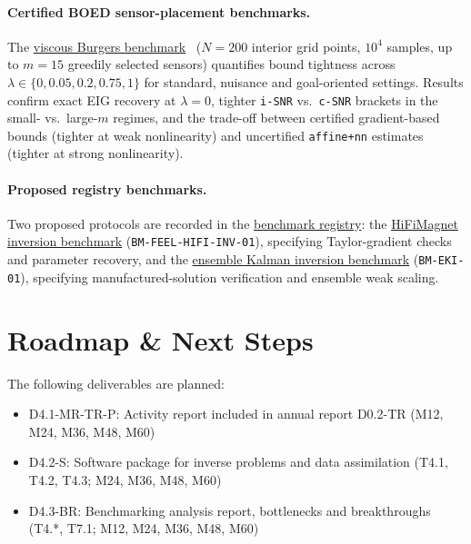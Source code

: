 \paragraph{Certified BOED sensor-placement benchmarks.}
The \hyperref[sec:wp4:sensor-placement]{viscous Burgers benchmark}~\cite{hal-05768497}
($N = 200$ interior grid points, $10^4$ samples, up to $m = 15$ greedily selected
sensors) quantifies bound tightness across $\lambda \in \{0, 0.05, 0.2, 0.75, 1\}$
for standard, nuisance and goal-oriented settings. Results confirm exact EIG
recovery at $\lambda = 0$, tighter \texttt{i-SNR} vs.\ \texttt{c-SNR} brackets
in the small- vs.\ large-$m$ regimes, and the trade-off between certified
gradient-based bounds (tighter at weak nonlinearity) and uncertified
\texttt{affine+nn} estimates (tighter at strong nonlinearity).

\paragraph{Proposed registry benchmarks.}
Two proposed protocols are recorded in the
\hyperref[tab:v3-benchmark-registry]{benchmark registry}: the
\hyperref[sec:app:specs:app-feelpp-hifimagnet-inverse]{HiFiMagnet
inversion benchmark} (\nolinkurl{BM-FEEL-HIFI-INV-01}), specifying
Taylor-gradient checks and parameter recovery, and the
\hyperref[sec:app:specs:app-eki]{ensemble Kalman inversion benchmark}
(\nolinkurl{BM-EKI-01}), specifying manufactured-solution verification
and ensemble weak scaling.

\section{Roadmap \& Next Steps}
\label{sec:wp4:roadmap}

The following deliverables are planned:
\begin{itemize}
\item D4.1-MR-TR-P: Activity report included in annual report D0.2-TR (M12, M24, M36, M48, M60)
\item D4.2-S: Software package for inverse problems and data assimilation (T4.1, T4.2, T4.3; M24, M36, M48, M60)
\item D4.3-BR: Benchmarking analysis report, bottlenecks and breakthroughs (T4.*, T7.1; M12, M24, M36, M48, M60)
\end{itemize}

